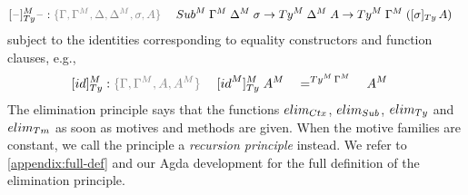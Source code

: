 \documentclass[a4paper,UKenglish,numberwithinsect,cleveref,thm-restate]{lipics-v2021}
\begin{document}
\begin{alignat*}{3}
  [\blank]_{\Ty}^M\blank & : \implicit{\Gamma, \Gamma^M,\Delta, \Delta^M, \sigma, A} \; && \Sub^M\;\Gamma^M\;\Delta^M\;\sigma \to \Ty^M\;\Delta^M\;A \to \Ty^M\;\Gamma^M\;([\sigma]_{\Ty}\,A) %
\end{alignat*}
subject to the identities corresponding to equality constructors and function clauses, e.g.,
\begin{alignat*}{5}
  [\idS]_{\Ty}^M & : \implicit{\Gamma, \Gamma^M, A, A^M}\; && [ \idS^M ]^M_{\Ty} \;A^M && =^{\Ty^M\,\Gamma^M}\;&& A^M %
\end{alignat*}
%
The elimination principle says that the functions $\elim_{\Ctx}$, $\elim_{\Sub}$, $\elim_{\Ty}$ and $\elim_{\Tm}$ as soon as motives and methods are given. When the motive families are constant, we call the principle a \emph{recursion principle} instead.
We refer to \cref{appendix:full-def} and our Agda development for the full definition of the elimination principle.
%
%
\end{document}
